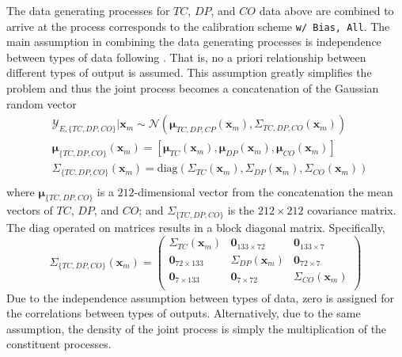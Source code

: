 The data generating processes for $TC$, $DP$, and $CO$ data above are combined to arrive at the process corresponds to the calibration scheme \texttt{w/ Bias, All}.
The main assumption in combining the data generating processes is independence between types of data following \cite{Reichert2012}.
That is, no a priori relationship between different types of output is assumed.
This assumption greatly simplifies the problem and thus the joint process becomes a concatenation of the Gaussian random vector 
\begin{equation}
	\begin{split}
		& \bm{\mathcal{Y}}_{E,\{TC,DP,CO\}} | \bm{x}_m \sim \mathcal{N} (\boldsymbol{\mu}_{TC,DP,CP} (\bm{x}_m), \Sigma_{TC,DP,CO} (\bm{x}_m)) \\
		& \boldsymbol{\mu}_{\{TC,DP,CO\}} (\bm{x}_m) = \left[ \boldsymbol{\mu}_{TC} (\bm{x}_m), \boldsymbol{\mu}_{DP} (\bm{x}_m), \boldsymbol{\mu}_{CO} (\bm{x}_m) \right ] \\
		& \Sigma_{\{TC,DP,CO\}} (\bm{x}_m) = \text{diag}(\Sigma_{TC} (\bm{x}_m), \Sigma_{DP} (\bm{x}_m), \Sigma_{CO} (\bm{x}_m)) \\
	\end{split}
\label{eq:likelihood_all}
\end{equation}
where $\boldsymbol{\mu}_{\{TC,DP,CO\}}$ is a $212$-dimensional vector from the concatenation the mean vectors of $TC$, $DP$, and $CO$;
and $\Sigma_{\{TC,DP,CO\}}$ is the $212 \times 212$ covariance matrix.
The $\text{diag}$ operated on matrices results in a block diagonal matrix.
Specifically,
\begin{equation}
   \Sigma_{\{TC,DP,CO\}} (\bm{x}_m) =  
    \begin{pmatrix}
      \Sigma_{TC} (\bm{x}_m)  & \bm{0}_{133\times72}    & \bm{0}_{133\times7}    \\
      \bm{0}_{72\times133}    & \Sigma_{DP} (\bm{x}_m)  & \bm{0}_{72\times7}     \\
      \bm{0}_{7\times133}     & \bm{0}_{7\times72}      & \Sigma_{CO} (\bm{x}_m) \\
    \end{pmatrix}
\label{eq:diag_cov_matrix}
\end{equation} 
Due to the independence assumption between types of data, zero is assigned for the correlations between types of outputs.
Alternatively, due to the same assumption, the density of the joint process is simply the multiplication of the constituent processes.

